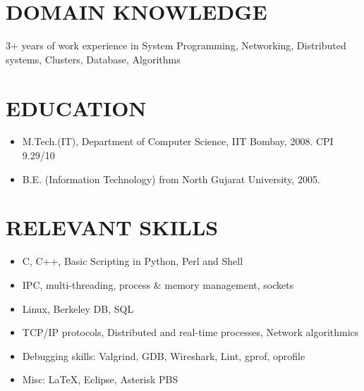 \documentclass{res}
\begin{document}
\begin{resume}

					 \section{DOMAIN KNOWLEDGE}

					 3+ years of work experience in System Programming, Networking, Distributed systems, Clusters, Database, Algorithms 
					  
					  \section{EDUCATION}
					  \begin{itemize}
					  \item M.Tech.(IT), Department of Computer Science, IIT Bombay, 2008. CPI 9.29/10 
					  \item B.E. (Information Technology) from North Gujarat University, 2005. 
					  \end{itemize}

					  \section{RELEVANT SKILLS}

					  \begin{itemize}
					  \item C, C++, Basic Scripting in Python, Perl and Shell 
					  \item IPC, multi-threading, process \& memory management, sockets
					  \item Linux, Berkeley DB, SQL
					  \item TCP/IP protocols, Distributed and real-time processes, Network algorithmics
				          \item Debugging skills: Valgrind, GDB, Wireshark, Lint, gprof, oprofile 
					  \item Misc: \LaTeX, Eclipse, Asterisk PBS
					  \end{itemize}


\end{resume}
\end{document}
